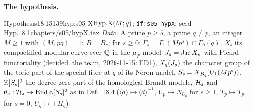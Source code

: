 \medskip\noindent\textbf{The hypothesis.}\par
\begin{quoted}{Hypothesis}{18.15}{139}{hyp:s05-X}{$\mathrm{Hyp.X}(M;q)$; \texttt{if:s05-hypX}; seed Hyp.~8.1}{chapters/s05/hypX.tex}\label{rpt:hyp:s05-X}
\emph{Data.} A prime $p\ge5$, a prime $q\ne p$, an integer $M\ge1$ with $(M,pq)=1$; $B=B_q$; for $s\ge0$:
$\Gamma_s=\Gamma_1(Mp^s)\cap\Gamma_0(q)$, $X_s$ its compactified modular curve over $\mathbb{Q}$ in the $\mu_N$-model, $J_s=\operatorname{Jac} X_s$ with Picard
functoriality (decided, the team, 2026-11-15: FD1), $X_q(J_s)$ the character group of the toric part of the special fibre at $q$ of its Néron model,
$S_s=X_{B_q}(U_1(Mp^s))$, $\mathbb{Z}[S_s]^0$ the degree-zero part of the homological Brandt module, $\mathcal{H}_s$ and
$\theta_s:\mathcal{H}_s\to\operatorname{End}\mathbb{Z}[S_s]^0$ as in Def.~18.4 ($\langle d\rangle\mapsto\langle d\rangle^{-1}$, $U_p\mapsto N_{U_p}$ for $s\ge1$,
$T_p\mapsto T_p$ for $s=0$, $U_q\mapsto+\Pi_q$).


\end{quoted}
